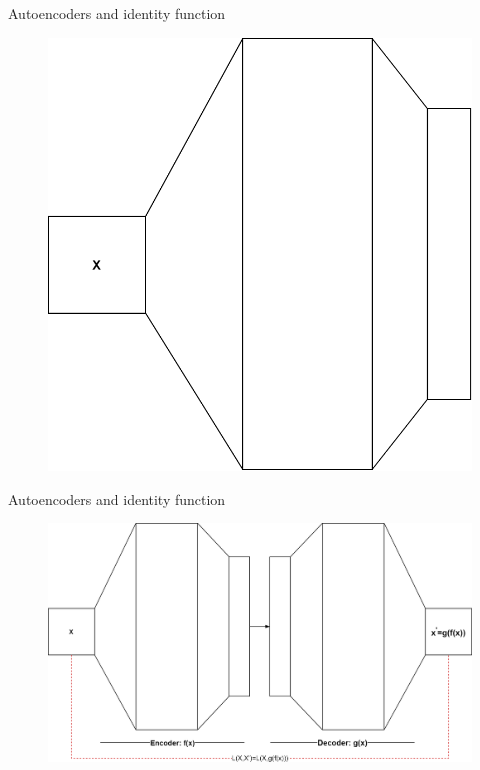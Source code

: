 \begin{frame}{Autoencoders and identity function} 
	\begin{center}
		\begin{figure}
			\includegraphics[width=.5\textwidth]{figures/autoencoder_2}
		\end{figure}
	\end{center}
\end{frame}
\begin{frame}{Autoencoders and identity function} 
	\begin{center}
		\begin{figure}
			\includegraphics[width=.9\textwidth]{figures/autoencoder_3}
		\end{figure}
	\end{center}
\end{frame}
